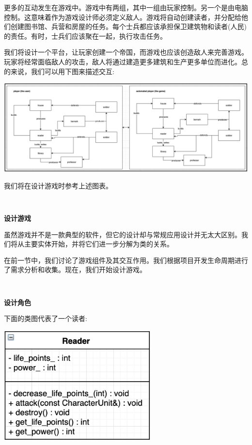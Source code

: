 更多的互动发生在游戏中。游戏中有两组，其中一组由玩家控制。另一个是由电脑控制。这意味着作为游戏设计师必须定义敌人。游戏将自动创建读者，并分配给他们创建图书馆、兵营和房屋的任务。每个士兵都应该承担保卫建筑物和读者(人民)的责任。有时，士兵们应该聚在一起，执行攻击任务。 \par
我们将设计一个平台，让玩家创建一个帝国，而游戏也应该创造敌人来完善游戏。玩家将经常面临敌人的攻击，敌人将通过建造更多建筑和生产更多单位而进化。总的来说，我们可以用下图来描述交互: \par

\begin{center}
	\includegraphics[width=1.0\textwidth]{content/Section-2/Chapter-11/3}
\end{center}

我们将在设计游戏时参考上述图表。 \par

\noindent\textbf{}\ \par
\textbf{设计游戏} \ \par
虽然游戏并不是一款典型的软件，但它的设计却与常规应用设计并无太大区别。我们将从主要实体开始，并将它们进一步分解为类的关系。 \par
在前一节中，我们讨论了游戏组件及其交互作用。我们根据项目开发生命周期进行了需求分析和收集。现在，我们开始设计游戏。 \par

\noindent\textbf{}\ \par
\textbf{设计角色} \ \par
下面的类图代表了一个读者: \par

\begin{center}
	\includegraphics[width=0.6\textwidth]{content/Section-2/Chapter-11/4}
\end{center}

